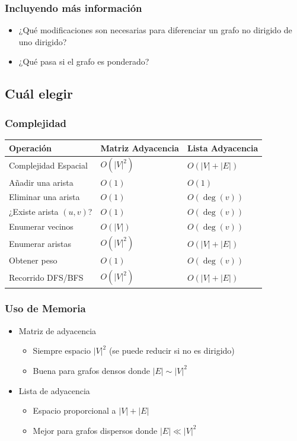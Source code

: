 \documentclass[11pt]{beamer}
\begin{document}
\begin{frame}\frametitle{Incluyendo más información}
\begin{itemize}
\item ¿Qué modificaciones son necesarias para diferenciar un grafo no dirigido de uno dirigido?
\item ¿Qué pasa si el grafo es ponderado?
\end{itemize}
\end{frame}

\subsection{Cuál elegir}

\begin{frame}\frametitle{Complejidad}
\begin{center}
\begin{tabular}{@{} lll @{}}
\toprule
\textbf{Operación} & \textbf{Matriz Adyacencia} & \textbf{Lista Adyacencia} \\
\midrule
Complejidad Espacial             & $O(|V|^2)$           & $O(|V| + |E|)$            \\
Añadir una arista                & $O(1)$               & $O(1)$                \\
Eliminar una arista              & $O(1)$               & $O(\deg(v))$          \\
¿Existe arista $(u,v)$?          & $O(1)$               & $O(\deg(v))$          \\
Enumerar vecinos                 & $O(|V|)$             & $O(\deg(v))$          \\
Enumerar aristas                 & $O(|V|^2)$           & $O(|V| + |E|)$            \\
Obtener peso                     & $O(1)$               & $O(\deg(v))$          \\
Recorrido DFS/BFS                & $O(|V|^2)$           & $O(|V| + |E|)$            \\
\bottomrule
\end{tabular}
\end{center}
\end{frame}

\begin{frame}\frametitle{Uso de Memoria}
\begin{itemize}
\item Matriz de adyacencia
    \begin{itemize}
    \item Siempre espacio $|V|^2$ (se puede reducir si no es dirigido)
    \item Buena para grafos densos donde $|E| \sim |V|^2$
    \end{itemize}
\item Lista de adyacencia
    \begin{itemize}
    \item Espacio proporcional a $|V| + |E|$
    \item Mejor para grafos dispersos donde $|E| \ll |V|^2$
    \end{itemize}
\end{itemize}
\end{frame}
\end{document}
